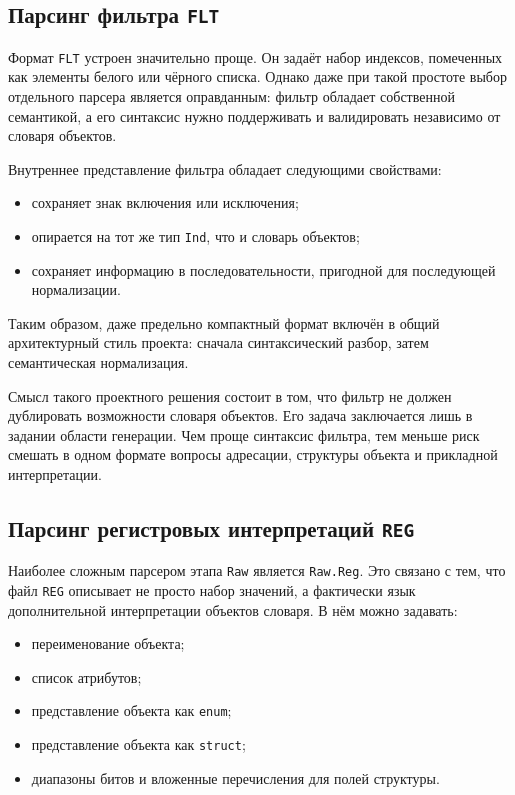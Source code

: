 \documentclass[a4paper,12pt]{article}
\begin{document}
\subsection{Парсинг фильтра \texttt{FLT}}

Формат \texttt{FLT} устроен значительно проще. Он задаёт набор индексов, помеченных как
элементы белого или чёрного списка. Однако даже при такой простоте выбор отдельного
парсера является оправданным: фильтр обладает собственной семантикой, а его синтаксис
нужно поддерживать и валидировать независимо от словаря объектов.

Внутреннее представление фильтра обладает следующими свойствами:
\begin{itemize}
  \item сохраняет знак включения или исключения;
  \item опирается на тот же тип \texttt{Ind}, что и словарь объектов;
  \item сохраняет информацию в последовательности, пригодной для последующей
  нормализации.
\end{itemize}

Таким образом, даже предельно компактный формат включён в общий архитектурный стиль
проекта: сначала синтаксический разбор, затем семантическая нормализация.

Смысл такого проектного решения состоит в том, что фильтр не должен дублировать
возможности словаря объектов. Его задача заключается лишь в задании области генерации.
Чем проще синтаксис фильтра, тем меньше риск смешать в одном формате вопросы адресации,
структуры объекта и прикладной интерпретации.

\subsection{Парсинг регистровых интерпретаций \texttt{REG}}

Наиболее сложным парсером этапа \texttt{Raw} является \texttt{Raw.Reg}. Это связано с
тем, что файл \texttt{REG} описывает не просто набор значений, а фактически язык
дополнительной интерпретации объектов словаря. В нём можно задавать:
\begin{itemize}
  \item переименование объекта;
  \item список атрибутов;
  \item представление объекта как \texttt{enum};
  \item представление объекта как \texttt{struct};
  \item диапазоны битов и вложенные перечисления для полей структуры.
\end{itemize}
\end{document}
